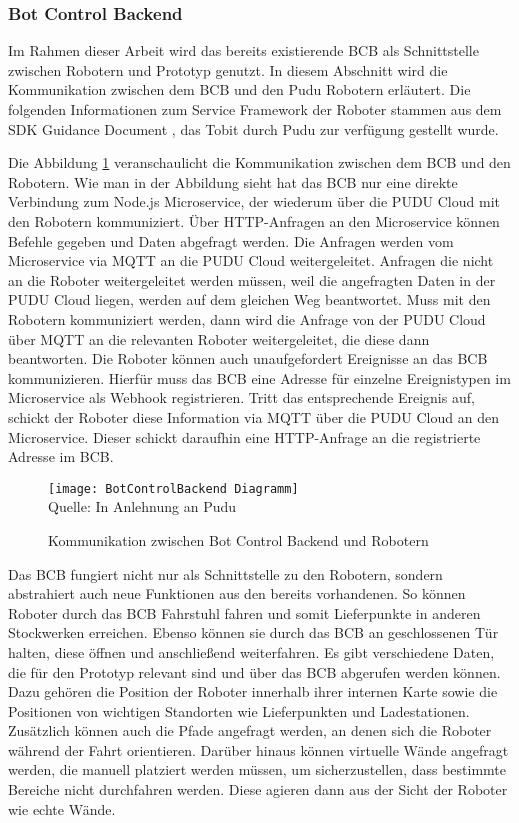 \subsubsection{Bot Control Backend}\label{sec:BotControlBackend}
Im Rahmen dieser Arbeit wird das bereits existierende \ac{BCB} als Schnittstelle zwischen Robotern und Prototyp genutzt. In diesem Abschnitt wird die Kommunikation zwischen dem \ac{BCB} und den Pudu Robotern erläutert. Die folgenden Informationen zum Service Framework der Roboter stammen aus dem SDK Guidance Document \cite{PuduSDK}, das Tobit durch Pudu zur verfügung gestellt wurde.

Die Abbildung \ref{fig:BotControlBackendCommunication} veranschaulicht die Kommunikation zwischen dem \ac{BCB} und den Robotern. Wie man in der Abbildung sieht hat das \ac{BCB} nur eine direkte Verbindung zum Node.js Microservice, der wiederum über die PUDU Cloud mit den Robotern kommuniziert. Über \gls{HTTP}-Anfragen an den Microservice können Befehle gegeben und Daten abgefragt werden. Die Anfragen werden vom Microservice via \gls{MQTT} an die PUDU Cloud weitergeleitet. Anfragen die nicht an die Roboter weitergeleitet werden müssen, weil die angefragten Daten in der PUDU Cloud liegen, werden auf dem gleichen Weg beantwortet. Muss mit den Robotern kommuniziert werden, dann wird die Anfrage von der PUDU Cloud über \gls{MQTT} an die relevanten Roboter weitergeleitet, die diese dann beantworten. Die Roboter können auch unaufgefordert Ereignisse an das \ac{BCB} kommunizieren. Hierfür muss das \ac{BCB} eine Adresse für einzelne Ereignistypen im Microservice als \gls{Webhook} registrieren. Tritt das entsprechende Ereignis auf, schickt der Roboter diese Information via \gls{MQTT} über die PUDU Cloud an den Microservice. Dieser schickt daraufhin eine HTTP-Anfrage an die registrierte Adresse im \ac{BCB}.

\begin{figure}[H]
\caption{Kommunikation zwischen Bot Control Backend und Robotern}\label{fig:BotControlBackendCommunication}
\texttt{[image: BotControlBackend Diagramm]}
\\
Quelle: In Anlehnung an Pudu \cite[S.~4]{PuduSDK}
\end{figure}

Das \ac{BCB} fungiert nicht nur als Schnittstelle zu den Robotern, sondern abstrahiert auch neue Funktionen aus den bereits vorhandenen. So können Roboter durch das \ac{BCB} Fahrstuhl fahren und somit Lieferpunkte in anderen Stockwerken erreichen. Ebenso können sie durch das \ac{BCB} an geschlossenen Tür halten, diese öffnen und anschließend weiterfahren. Es gibt verschiedene Daten, die für den Prototyp relevant sind und über das \ac{BCB} abgerufen werden können. Dazu gehören die Position der Roboter innerhalb ihrer internen Karte sowie die Positionen von wichtigen Standorten wie Lieferpunkten und Ladestationen. Zusätzlich können auch die Pfade angefragt werden, an denen sich die Roboter während der Fahrt orientieren. Darüber hinaus können virtuelle Wände angefragt werden, die manuell platziert werden müssen, um sicherzustellen, dass bestimmte Bereiche nicht durchfahren werden. Diese agieren dann aus der Sicht der Roboter wie echte Wände.


